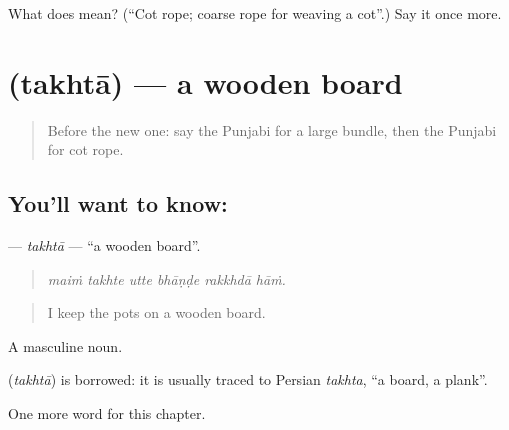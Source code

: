 \begin{tcolorbox}[breakable,colback=teal!4,colframe=teal!35!black,title={Before you move on}]
What does  mean? (\textquotedblleft{}Cot rope; coarse rope for weaving a cot\textquotedblright{}.) Say it once more.
\end{tcolorbox}
\section[\texorpdfstring{\pa{ਤਖ਼ਤਾ} (takhtā)}{ਤਖ਼ਤਾ (takhtā)}]{ (takhtā) — a wooden board}

\label{lesson:PA-C252-takhta}



\begin{quote}
Before the new one: say the Punjabi for a large bundle, then the Punjabi for cot rope.
\end{quote}

\subsection*{You'll want to know: }
\textbf{} — \emph{takhtā} — \textquotedblleft{}a wooden board\textquotedblright{}.

\begin{quote}
     
\end{quote}

\begin{quote}
\emph{maiṁ takhte utte bhāṇḍe rakkhdā hāṁ.}
\end{quote}

\begin{quote}
I keep the pots on a wooden board.
\end{quote}

A masculine noun.

\begin{cousinweb}
\textbf{} (\emph{takhtā}) is borrowed: it is usually traced to Persian \emph{takhta}, \textquotedblleft{}a board, a plank\textquotedblright{}.
\end{cousinweb}

\begin{grammarlens}[title={What you've built}]
One more word for this chapter.
\end{grammarlens}

